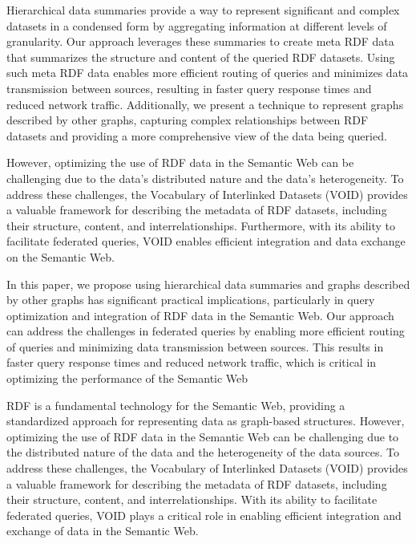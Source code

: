 Hierarchical data summaries provide a way to represent significant and complex datasets in a condensed form by aggregating information at different levels of granularity. Our approach leverages these summaries to create meta RDF data that summarizes the structure and content of the queried RDF datasets. Using such meta RDF data enables more efficient routing of queries and minimizes data transmission between sources, resulting in faster query response times and reduced network traffic. Additionally, we present a technique to represent graphs described by other graphs, capturing complex relationships between RDF datasets and providing a more comprehensive view of the data being queried.

However, optimizing the use of RDF data in the Semantic Web can be challenging due to the data's distributed nature and the data's heterogeneity. To address these challenges, the Vocabulary of Interlinked Datasets (VOID) provides a valuable framework for describing the metadata of RDF datasets, including their structure, content, and interrelationships. Furthermore, with its ability to facilitate federated queries, VOID enables efficient integration and data exchange on the Semantic Web. 

In this paper, we propose using hierarchical data summaries and graphs described by other graphs has significant practical implications, particularly in query optimization and integration of RDF data in the Semantic Web. Our approach can address the challenges in federated queries by enabling more efficient routing of queries and minimizing data transmission between sources. This results in faster query response times and reduced network traffic, which is critical in optimizing the performance of the Semantic Web

RDF is a fundamental technology for the Semantic Web, providing a standardized approach for representing data as graph-based structures. However, optimizing the use of RDF data in the Semantic Web can be challenging due to the distributed nature of the data and the heterogeneity of the data sources. To address these challenges, the Vocabulary of Interlinked Datasets (VOID) provides a valuable framework for describing the metadata of RDF datasets, including their structure, content, and interrelationships. With its ability to facilitate federated queries, VOID plays a critical role in enabling efficient integration and exchange of data in the Semantic Web. 

